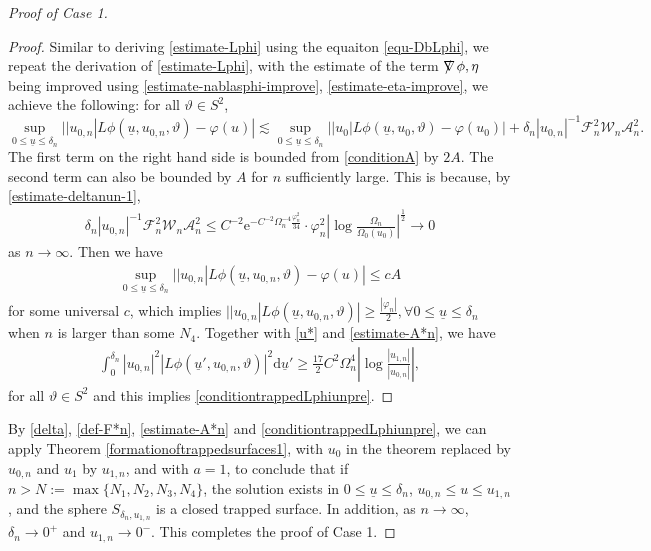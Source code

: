 \documentclass[11pt,reqno]{amsart}
\theoremstyle{definition}
\numberwithin{equation}{section}
\newcommand{\D}{\mathrm{d}}
\def\ub{\underline{u}}
\def\nablas{\mbox{$\nabla \mkern -13mu /$ }}
\begin{document}
\begin{proof}[Proof of Case 1]
\begin{proof}
Similar to deriving \eqref{estimate-Lphi} using the equaiton \eqref{equ-DbLphi}, we repeat the derivation of \eqref{estimate-Lphi}, with the estimate of the term $\nablas\phi,\eta$ being improved using \eqref{estimate-nablasphi-improve},  \eqref{estimate-eta-improve}, we achieve the following: for all $\vartheta\in S^2$,
\begin{equation}\label{estimate-uLphi-varphi-improve}
\sup_{0\le\ub\le\delta_n}||u_{0,n}|L\phi(\ub,u_{0,n},\vartheta)-\varphi(u)|\lesssim \sup_{0\le\ub\le\delta_n}||u_0|L\phi(\ub,u_0,\vartheta)-\varphi(u_0)|+\delta_n|u_{0,n}|^{-1}\mathscr{F}_n^2\mathscr{W}_n\mathcal{A}_n^2.
\end{equation}
The first term on the right hand side is bounded from \eqref{conditionA} by $2A$. The second term can also be bounded by $A$ for $n$ sufficiently large. This is because, by \eqref{estimate-deltanun-1},
\begin{align*}
\delta_n|u_{0,n}|^{-1}\mathscr{F}_n^2\mathscr{W}_n\mathcal{A}_n^2\le C^{-2}\mathrm{e}^{-C^{-2}\Omega_n^{-4}\frac{\varphi_n^2}{34}}\cdot\varphi_n^2\left|\log\frac{\Omega_n}{\Omega_0(u_0)}\right|^{\frac{1}{2}}\to0
\end{align*}
as $n\to\infty$.
Then we have
\begin{align*}
\sup_{0\le\ub\le\delta_n}||u_{0,n}|L\phi(\ub,u_{0,n},\vartheta)-\varphi(u)|\le cA
\end{align*}
for some universal $c$, which implies $||u_{0,n}|L\phi(\ub,u_{0,n},\vartheta)|\ge\frac{|\varphi_n|}{2}, \forall0\le\ub\le\delta_n$ when $n$ is larger than some $N_4$.
Together with \eqref{u*} and \eqref{estimate-A*n}, we have
\begin{align*}
\int_0^{\delta_n}|u_{0,n}|^2|L\phi(\ub',u_{0,n},\vartheta)|^2\D\ub'\ge\frac{17}{2}C^2\Omega_n^4\left|\log\frac{|u_{1,n}|}{|u_{0,n}|}\right|,
\end{align*}
for all $\vartheta\in S^2$ and this implies \eqref{conditiontrappedLphiunpre}.

\end{proof}

By \eqref{delta}, \eqref{def-F*n},  \eqref{estimate-A*n} and \eqref{conditiontrappedLphiunpre}, we can apply Theorem \ref{formationoftrappedsurfaces1}, with $u_0$ in the theorem replaced by $u_{0,n}$ and $u_1$ by $u_{1,n}$, and with $a=1$, to conclude that if $n>N:=\max\{N_1,N_2,N_3,N_4\}$, the solution exists in $0\le\ub\le\delta_n$, $u_{0,n}\le u\le u_{1,n}$, and the sphere $S_{\delta_n, u_{1,n}}$ is a closed trapped surface. In addition, as $n\to\infty$, $\delta_n\to0^+$ and $u_{1,n}\to0^-$. This completes the proof of Case 1.

\end{proof}
\end{document}
